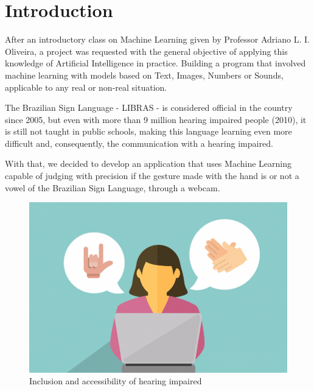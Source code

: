 \documentclass[a4paper, 12pt]{article}
\begin{document}
\newpage
{}

\section{Introduction}

After an introductory class on Machine Learning given by Professor Adriano L. I. Oliveira, a project was requested with the general objective of applying this knowledge of Artificial Intelligence in practice. Building a program that involved machine learning with models based on Text, Images, Numbers or Sounds, applicable to any real or non-real situation.

The Brazilian Sign Language - LIBRAS - is considered official in the country since 2005\cite{planalto}, but even with more than 9 million hearing impaired people (2010)\cite{ibge}, it is still not taught in public schools, making this language learning even more difficult and, consequently, the communication with a hearing impaired.

With that, we decided to develop an application that uses Machine Learning capable of judging with precision if the gesture made with the hand is or not a vowel of the Brazilian Sign Language, through a webcam.

\begin{figure}[!ht]
\centering
\includegraphics[scale=0.2]{img/inclusion.png}
\caption{Inclusion and accessibility of hearing impaired\cite{figure_1}}
\label{figure_1}
\end{figure}


\end{document}
